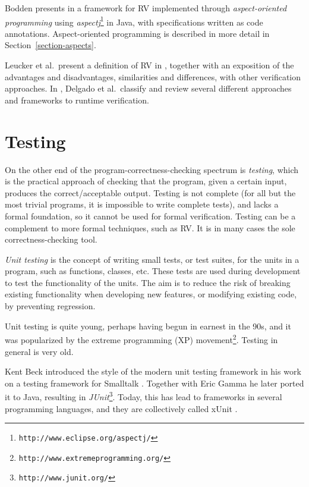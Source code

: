 \documentclass[a4paper,11pt]{kth-mag}
\begin{document}
Bodden presents in \cite{bodden05efficientrv} a framework for RV implemented
through \emph{aspect-oriented programming} using
\textit{aspectj}\footnote{\texttt{http://www.eclipse.org/aspectj/}} in Java,
with specifications written as code annotations. Aspect-oriented programming is
described in more detail in Section~\ref{section-aspects}.

Leucker et al.\ present a definition of RV in \cite{leucker09abriefaccount},
together with an exposition of the advantages and disadvantages, similarities
and differences, with other verification approaches. In
\cite{delgado04taxonomy}, Delgado et al.\ classify and review several different
approaches and frameworks to runtime verification.


\section{Testing} \label{section-testing}
On the other end of the program-correctness-checking spectrum is
\emph{testing}, which is the practical approach of checking that the program,
given a certain input, produces the correct/acceptable output. Testing is not
complete (for all but the most trivial programs, it is impossible to write
complete tests), and lacks a formal foundation, so it cannot be used for formal
verification. Testing can be a complement to more formal techniques, such as
RV. It is in many cases the sole correctness-checking tool.

\textit{Unit testing} is the concept of writing small tests, or test suites,
for the units in a program, such as functions, classes, etc. These tests are
used during development to test the functionality of the units. The aim is to
reduce the risk of breaking existing functionality when developing new
features, or modifying existing code, by preventing regression.

Unit testing is quite young, perhaps having begun in earnest in the 90s, and it
was popularized by the extreme programming (XP)
movement\footnote{\texttt{http://www.extremeprogramming.org/}}. Testing in
general is very old.

Kent Beck introduced the style of the modern unit testing framework in his work
on a testing framework for Smalltalk \cite{becksmalltalktesting}. Together
with Eric Gamma he later ported it to Java, resulting in
\textit{JUnit}\footnote{\texttt{http://www.junit.org/}}.
Today, this has lead to frameworks in several programming languages, and they
are collectively called xUnit \cite{fowlerxunit}.
\end{document}
